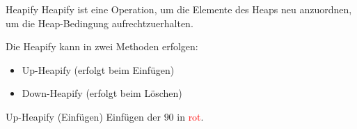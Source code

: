\begin{defi}{Heapify}
    Heapify ist eine Operation, um die Elemente des Heaps neu anzuordnen, um die Heap-Bedingung aufrechtzuerhalten.

    Die Heapify kann in zwei Methoden erfolgen:
    \begin{itemize}
        \item Up-Heapify (erfolgt beim Einfügen)
        \item Down-Heapify (erfolgt beim Löschen)
    \end{itemize}

\end{defi}

\begin{algo}{Up-Heapify (Einfügen)}
    Einfügen der $90$ in \textcolor{red}{rot}.

    \vspace{1em}
    \begin{center}
        \hspace{1em}
        \scalebox{0.9}{
            \begin{forest}

\end{forest}}
\end{center}
\end{algo}
